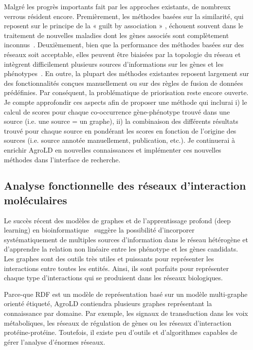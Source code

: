 Malgré les progrès importants fait par les approches existants, de nombreux verrous résident encore. Premièrement, les méthodes basées sur la similarité, qui reposent sur le principe de la  « guilt by association » , échouent souvent dans le traitement de nouvelles maladies dont les gènes associés sont complètement inconnus~\cite{zakeri2018}. Deuxièmement, bien que la performance des méthodes basées sur des réseaux soit acceptable, elles peuvent être biaisées par la topologie du réseau et intègrent difficilement plusieurs sources d'informations sur les gènes et les phénotypes~\cite{Moreau2012}. En outre, la plupart des méthodes existantes reposent largement sur des fonctionnalités conçues manuellement ou sur des règles de fusion de données prédéfinies. Par conséquent, la problématique de priorisation reste encore ouverte. \\

Je compte approfondir ces aspects afin de proposer une méthode qui inclurai i) le calcul de scores pour chaque co-occurrence gène-phénotype trouvé dans une source (i.e. une source = un graphe), ii) la combinaison des différents résultats trouvé pour chaque source en pondérant les scores en fonction de l’origine des sources (i.e. source annotée manuellement, publication, etc.). Je continuerai à enrichir AgroLD en nouvelles connaissances et implémenter ces nouvelles méthodes dans l’interface de recherche. 

\subsection{Analyse fonctionnelle des réseaux d'interaction moléculaires}
Le succès récent des modèles de graphes et de l'apprentissage profond (deep learning) en bioinformatique~\cite{zitnik2018,li2018,sequence2vec2017,kim2018,xia2018} suggère la possibilité d’incorporer systématiquement de multiples sources d’information dans le réseau hétérogène et d’apprendre la relation non linéaire entre les phénotype et les gènes candidats. Les graphes sont des outils très utiles et puissants pour représenter les interactions entre toutes les entités. Ainsi, ils sont parfaits pour représenter chaque type d'interactions qui se produisent dans les réseaux biologiques.

Parce-que RDF est un modèle de représentation basé sur un modèle multi-graphe orienté étiqueté, AgroLD contiendra plusieurs graphes représentant la connaissance par domaine. Par exemple, les signaux de transduction dans les voix métaboliques, les réseaux de régulation de gènes ou les réseaux d'interaction protéine-protéine. Toutefois, il existe peu d'outils et d'algorithmes capables de gérer l'analyse d'énormes réseaux.

